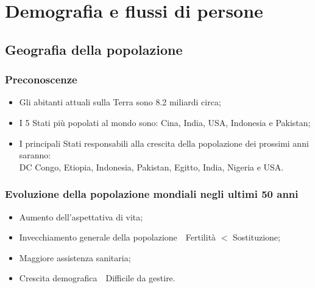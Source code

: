 \documentclass{article}
\begin{document}
\section{Demografia e flussi di persone}
\subsection{Geografia della popolazione}
\subsubsection{Preconoscenze}
\begin{itemize}
    \item Gli abitanti attuali sulla Terra sono 8.2 miliardi circa;
    \item I 5 Stati più popolati al mondo sono: Cina, India, USA, Indonesia e Pakistan;
    \item I principali Stati responsabili alla crescita della popolazione dei prossimi anni
        saranno:\\ DC Congo, Etiopia, Indonesia, Pakistan, Egitto, India, Nigeria e USA.
\end{itemize}

\subsubsection{Evoluzione della popolazione mondiali negli ultimi 50 anni}
\begin{itemize}
    \item Aumento dell'aspettativa di vita;
    \item Invecchiamento generale della popolazione\ \textrightarrow\ Fertilità $<$ Sostituzione;
    \item Maggiore assistenza sanitaria;
    \item Crescita demografica\ \textrightarrow\ Difficile da gestire.
\end{itemize}
\end{document}
